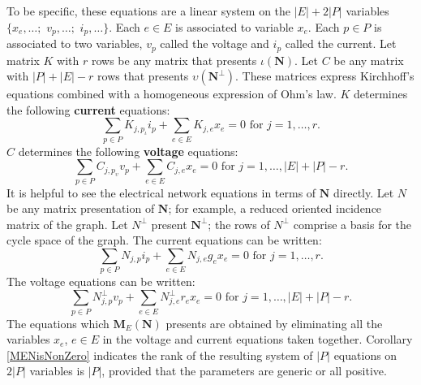 \documentclass[12pt]{article}
\theoremstyle{definition}
\newcommand{\Is}{\ensuremath{\iota}}
\newcommand{\Vs}{\ensuremath{\upsilon}}
\newcommand{\Card}[1]{\ensuremath{{\left|#1\right|}}}
\newcommand{\ext}[1]{\ensuremath{\mathbf{#1}}}
\begin{document}
To be specific, these equations are a linear system on the
$\Card{E}+2\Card{P}$ variables $\{x_e,\ldots;$
$ v_p,\ldots;$
$ i_p,\ldots\}$.
Each $e\in E$ is associated to variable $x_e$.  Each $p\in P$ is 
associated to two variables, $v_p$ called the voltage and 
$i_p$ called the current.
Let matrix $K$ with $r$ rows be any matrix that presents
$\Is(\ext{N})$.   Let $C$ be any matrix
with $\Card{P}+\Card{E}-r$ rows that presents $\Vs(\ext{N}^\perp)$.  
These matrices express 
Kirchhoff's equations combined with a homogeneous expression of Ohm's
law.
$K$ determines the following \textbf{current} equations:
\[
\sum_{p\in P}K_{j,p_\Is} i_p + \sum_{e\in E}K_{j,e}x_e = 0
\text{ for } j = 1, \ldots, r.
\]
$C$ determines the following \textbf{voltage} equations:
\[
\sum_{p\in P}C_{j,p_\Vs} v_p + \sum_{e\in E}C_{j,e}x_e = 0
\text{ for } j = 1, \ldots, \Card{E}+\Card{P} -r.
\]
It is helpful to see the electrical network equations in terms of 
$\ext{N}$ directly.  Let $N$ be any matrix presentation of $\ext{N}$; 
for example, a reduced oriented incidence matrix of the graph.
Let $N^\perp$ present $\ext{N}^\perp$; the rows of $N^\perp$ comprise a
basis for the cycle space of the graph.  The current equations can 
be written:
\[
\sum_{p\in P}N_{j,p} i_p + \sum_{e\in E}N_{j,e}g_ex_e = 0
\text{ for } j = 1, \ldots, r.
\]
The voltage equations can be written:
\[
\sum_{p\in P}N^\perp_{j,p} v_p + \sum_{e\in E}N^\perp_{j,e}r_ex_e = 0
\text{ for } j = 1, \ldots, \Card{E}+\Card{P} -r.
\]
The equations which $\ext{M}_E(\ext{N})$ 
presents are obtained by eliminating all 
the variables $x_e$, $e\in E$ in
the voltage and current equations taken together.  
Corollary \ref{MENisNonZero} indicates the rank of the resulting system
of $\Card{P}$ equations on $2\Card{P}$ variables is $\Card{P}$, provided that 
the parameters are generic or all positive.
\end{document}
